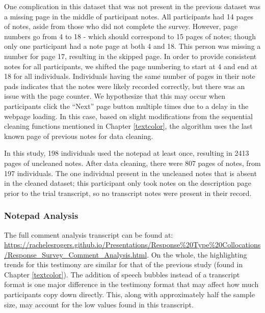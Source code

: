 \documentclass[print]{nuthesis}
\begin{document}
One complication in this dataset that was not present in the previous dataset was a missing page in the middle of participant notes.
All participants had 14 pages of notes, aside from those who did not complete the survey.
However, page numbers go from 4 to 18 - which should correspond to 15 pages of notes; though only one participant had a note page at both 4 and 18.
This person was missing a number for page 17, resulting in the skipped page.
In order to provide consistent notes for all participants, we shifted the page numbering to start at 4 and end at 18 for all individuals.
Individuals having the same number of pages in their note pads indicates that the notes were likely recorded correctly, but there was an issue with the page counter.
We hypothesize that this may occur when participants click the ``Next'' page button multiple times due to a delay in the webpage loading.
In this case, based on slight modifications from the sequential cleaning functions mentioned in Chapter \ref{textcolor}, the algorithm uses the last known page of previous notes for data cleaning.

In this study, 198 individuals used the notepad at least once, resulting in 2413 pages of uncleaned notes.
After data cleaning, there were 807 pages of notes, from 197 individuals.
The one individual present in the uncleaned notes that is absent in the cleaned dataset; this participant only took notes on the description page prior to the trial transcript, so no transcript notes were present in their record.

\hypertarget{notepad-analysis-1}{%
\subsubsection{Notepad Analysis}\label{notepad-analysis-1}}

The full comment analysis transcript can be found at: \url{https://rachelesrogers.github.io/Presentations/Response\%20Type\%20Collocations/Response_Survey_Comment_Analysis.html}.
On the whole, the highlighting trends for this testimony are similar for that of the previous study (found in Chapter \ref{textcolor}).
The addition of speech bubbles instead of a transcript format is one major difference in the testimony format that may affect how much participants copy down directly.
This, along with approximately half the sample size, may account for the low values found in this transcript.
\end{document}

